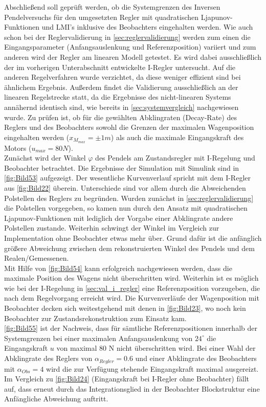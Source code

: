 Abschließend soll geprüft werden, ob die Systemgrenzen des Inversen Pendelversuchs für den umgesetzten Regler mit quadratischen Ljapunov-Funktionen und LMI's inklusive des Beobachters eingehalten werden. Wie auch schon bei der Reglervalidierung in \autoref{sec:reglervalidierung} werden zum einen die Eingangsparameter (Anfangsauslenkung und Referenzposition) variiert und zum anderen wird der Regler am linearen Modell getestet. Es wird dabei ausschließlich der im vorherigen Unterabschnitt entwickelte I-Regler untersucht. Auf die anderen Regelverfahren wurde verzichtet, da diese weniger effizient sind bei ähnlichem Ergebnis. Außerdem findet die Validierung ausschließlich an der linearen Regelstrecke statt, da die Ergebnisse des nicht-linearen Systems annähernd identisch sind, wie bereits in \autoref{sec:systemvergleich} nachgewiesen wurde. Zu prüfen ist, ob für die gewählten Abklingraten (Decay-Rate) des Reglers und des Beobachters sowohl die Grenzen der maximalen Wagenposition eingehalten werden ($ x_{M_{max}} = \pm 1 m$) als auch die maximale Eingangskraft des Motors ($u_{max} = 80 N$).\\
\newline
Zunächst wird der Winkel $\varphi$ des Pendels am Zustandsregler mit I-Regelung und Beobachter betrachtet. Die Ergebnisse der Simulation mit Simulink sind in \autoref{fig:Bild53} aufgezeigt. Der wesentliche Kurvenverlauf spricht mit dem I-Regler aus \autoref{fig:Bild22} überein. Unterschiede sind vor allem durch die Abweichenden Polstellen des Reglers zu begründen. Wurden zunächst in \autoref{sec:reglervalidierung} die Polstellen vorgegeben, so kamen nun durch den Ansatz mit quadratischen Ljapunov-Funktionen mit lediglich der Vorgabe einer Abklingrate andere Polstellen zustande. Weiterhin schwingt der Winkel im Vergleich zur Implementation ohne Beobachter etwas mehr über. Grund dafür ist die anfänglich größere Abweichung zwischen dem rekonstruierten Winkel des Pendels und dem Realen/Gemessenen. \\
\newline
Mit Hilfe von \autoref{fig:Bild54} kann erfolgreich nachgewiesen werden, dass die maximale Position des Wagens nicht überschritten wird. Weiterhin ist es möglich wie bei der I-Regelung in \autoref{sec:val_i_regler} eine Referenzposition vorzugeben, die nach dem Regelvorgang erreicht wird. Die Kurvenverläufe der Wagenposition mit Beobachter decken sich weitestgehend mit denen in \autoref{fig:Bild23}, wo noch kein Beobachter zur Zustandsrekonstruktion zum Einsatz kam. \\
\newline
\autoref{fig:Bild55} ist der Nachweis, dass für sämtliche Referenzpositionen innerhalb der Systemgrenzen bei einer maximalen Anfangsauslenkung von $24^\circ$ die Eingangskraft $u$ von maximal 80 N nicht überschritten wird. Bei einer Wahl der Abklingrate des Reglers von $\alpha_{Regler} = 0.6$ und einer Abklingrate des Beobachters mit $\alpha_{Obs} = 4$ wird die zur Verfügung stehende Eingangskraft maximal ausgereizt. Im Vergleich zu \autoref{fig:Bild24} (Eingangskraft bei I-Regler ohne Beobachter) fällt auf, dass erneut durch das Integrationsglied in der Beobachter Blockstruktur eine Anfängliche Abweichung auftritt.

